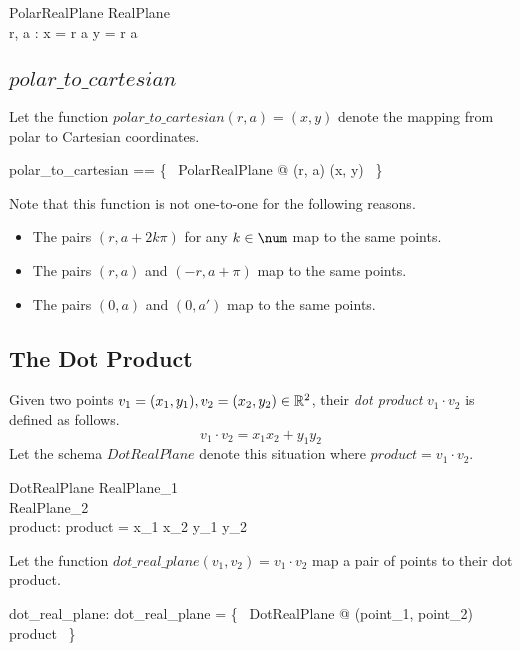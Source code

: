 \documentclass{amsart}
\begin{document}
\begin{schema}{PolarRealPlane}
	RealPlane \\
	r, a : \R
\where
	x = r \mulR \cosR a
\also
	y = r \mulR \sinR a
\end{schema}

\subsection{$polar\_to\_cartesian$}

Let the function $polar\_to\_cartesian(r, a) = (x, y)$ denote the mapping from
polar to Cartesian coordinates.

\begin{zed}
	polar\_to\_cartesian == \{~ PolarRealPlane @ (r, a) \mapsto (x, y) ~\}
\end{zed}

Note that this function is not one-to-one for the following reasons.
\begin{itemize}
	\item The pairs $(r, a + 2k\pi)$ for any $k \in \num$ map to the same points.
	\item The pairs $(r, a)$ and $(-r, a + \pi)$ map to the same points.
	\item The pairs $(0, a)$ and $(0, a')$ map to the same points.
\end{itemize}

\subsection{The Dot Product}

Given two points $v_1 = (x_1,y_1), v_2 = (x_2, y_2) \in \mathbb{R}^2$, 
their \textit{dot product} $v_1 \cdot v_2$ is defined as follows.
\begin{equation}
	v_1 \cdot v_2 = x_1 x_2 + y_1 y_2
\end{equation}
Let the schema $DotRealPlane$ denote this situation where $product = v_1 \cdot v_2$.

\begin{schema}{DotRealPlane}
	RealPlane_1 \\
	RealPlane_2 \\
	product: \R
\where
	product = x_1 \mulR x_2 \addR y_1 \mulR y_2
\end{schema}

Let the function $dot\_real\_plane(v_1, v_2) = v_1 \cdot v_2$ map a pair of points to their dot product.

\begin{axdef}
	dot\_real\_plane: \Rtwo \cross \Rtwo \fun \R
\where
	dot\_real\_plane = \{~ DotRealPlane @ (point_1, point_2) \mapsto product ~\}
\end{axdef}
\end{document}
